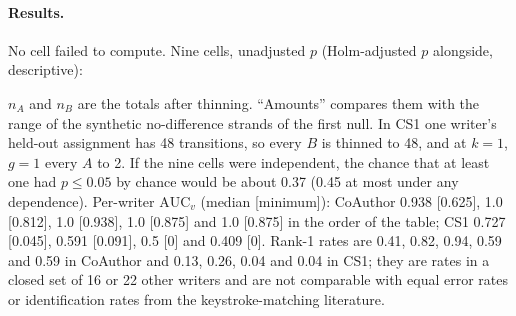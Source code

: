 \documentclass[10pt]{article}
\begin{document}
\paragraph{Results.} No cell failed to compute. Nine cells, unadjusted $p$ (Holm-adjusted $p$ alongside, descriptive):
\begin{center}\small
{}
\end{center}
$n_A$ and $n_B$ are the totals after thinning. ``Amounts'' compares them with the range of the synthetic no-difference strands of the first null. In CS1 one writer's held-out assignment has 48 transitions, so every $B$ is thinned to 48, and at $k=1$, $g=1$ every $A$ to 2. If the nine cells were independent, the chance that at least one had $p\le0.05$ by chance would be about 0.37 (0.45 at most under any dependence). Per-writer $\mathrm{AUC}_v$ (median [minimum]): CoAuthor 0.938 [0.625], 1.0 [0.812], 1.0 [0.938], 1.0 [0.875] and 1.0 [0.875] in the order of the table; CS1 0.727 [0.045], 0.591 [0.091], 0.5 [0] and 0.409 [0]. Rank-1 rates are 0.41, 0.82, 0.94, 0.59 and 0.59 in CoAuthor and 0.13, 0.26, 0.04 and 0.04 in CS1; they are rates in a closed set of 16 or 22 other writers and are not comparable with equal error rates or identification rates from the keystroke-matching literature.
\end{document}
